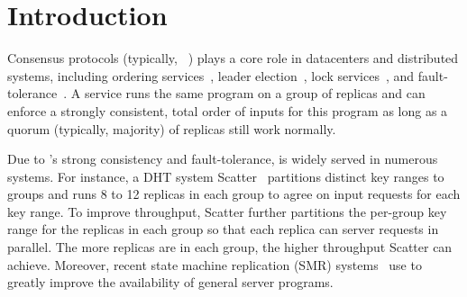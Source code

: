 \section{Introduction} \label{sec:intro}

Consensus protocols (typically, 
\paxos~\cite{paxos:practical,paxos,paxos:simple,paxos:complex}) plays a core 
role in datacenters and distributed systems, including ordering 
services~\cite{ellis:thesis,manos:hotdep10,scatter:sosp11}, leader 
election~\cite{zookeeper}, lock services~\cite{chubby:osdi}, and 
fault-tolerance~\cite{eve:osdi12,rex:eurosys14,crane:sosp15}. A \paxos service 
runs the same program on a group of replicas and can enforce a strongly 
consistent, total order of inputs for this program as long as a quorum 
(typically, majority) of replicas still work normally.

Due to \paxos's strong consistency and fault-tolerance, \paxos is widely served 
in numerous systems. For instance, a DHT system Scatter~\cite{scatter:sosp11} 
partitions distinct key ranges to \paxos groups and runs 8 to 12 replicas 
in each group to agree on input requests for each key range. To improve 
throughput, Scatter further partitions the per-group key range for the replicas 
in each group so that each replica can server requests in parallel. The more 
replicas are in each group, the higher throughput Scatter can achieve. Moreover, 
recent state machine replication (SMR) systems~\cite{ crane:sosp15, eve:osdi12, 
rex:eurosys14} use \paxos to greatly improve the availability of general server 
programs.






